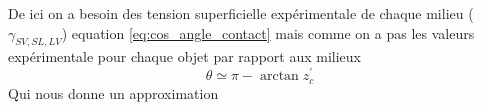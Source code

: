         De ici on a besoin des tension superficielle expérimentale de chaque milieu ($\gamma_{SV, SL, LV}$) equation \ref{eq:cos_angle_contact} mais comme on a pas les valeurs expérimentale pour chaque objet par rapport aux milieux 
        \begin{equation}
            \theta \simeq \pi - \arctan z_c^{'}
        \end{equation}
        Qui nous donne un approximation
